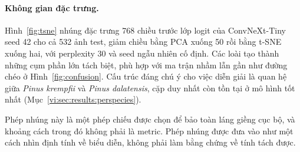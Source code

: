 \paragraph{Không gian đặc trưng.} Hình~\ref{fig:tsne} nhúng đặc trưng 768 chiều
trước lớp logit của ConvNeXt-Tiny seed 42 cho cả 532 ảnh test, giảm chiều bằng
PCA xuống 50 rồi bằng t-SNE xuống hai, với perplexity 30 và seed ngẫu nhiên cố
định. Các loài tạo thành những cụm phần lớn tách biệt, phù hợp với ma trận
nhầm lẫn gần như đường chéo ở Hình~\ref{fig:confusion}. Cấu trúc đáng chú ý
cho việc diễn giải là quan hệ giữa \textit{Pinus krempfii} và \textit{Pinus
dalatensis}, cặp duy nhất còn tồn tại ở mô hình tốt nhất
(Mục~\ref{vi:sec:results:perspecies}).



Phép nhúng này là một phép chiếu được chọn để bảo toàn láng giềng cục bộ, và
khoảng cách trong đó không phải là metric. Phép nhúng được đưa vào như một
cách nhìn định tính về biểu diễn, không phải làm bằng chứng về tính tách được.
